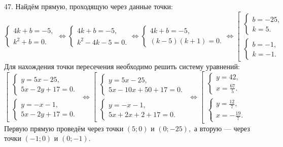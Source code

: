 47. Найдём прямую, проходящую через данные точки: $\begin{cases} 4k+b=-5,\\ k^2+b=0.\end{cases}\Leftrightarrow
\begin{cases} 4k+b=-5,\\ k^2-4k-5=0.\end{cases}\Leftrightarrow\begin{cases} 4k+b=-5,\\ (k-5)(k+1)=0.\end{cases}\Leftrightarrow
\left[\begin{array}{l}\begin{cases} b=-25,\\ k=5.\end{cases}\\ \begin{cases} b=-1,\\ k=-1.\end{cases}\end{array}\right.$ Для нахождения точки пересечения необходимо решить систему уравнений: $\left[\begin{array}{l}\begin{cases} y=5x-25,\\ 5x-2y+17=0.\end{cases}\\ \begin{cases} y=-x-1,\\ 5x-2y+17=0.\end{cases}\end{array}\right.
\Leftrightarrow\left[\begin{array}{l}\begin{cases} y=5x-25,\\ 5x-10x+50+17=0.\end{cases}\\ \begin{cases} y=-x-1,\\ 5x+2x+2+17=0.\end{cases}\end{array}\right.
\Leftrightarrow\left[\begin{array}{l}\begin{cases} y=42,\\ x=\frac{67}{5}.\end{cases}\\ \begin{cases} y=\frac{12}{7},\\ x=-\frac{19}{7}.\end{cases}\end{array}\right.$ Первую прямую проведём через точки $(5;0)$ и $(0;-25),$ а вторую --- через точки $(-1;0)$ и $(0;-1).$
